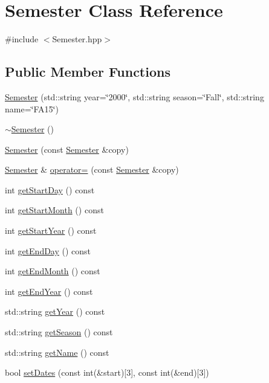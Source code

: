 \hypertarget{class_semester}{}\section{Semester Class Reference}
\label{class_semester}


{\ttfamily \#include $<$Semester.\+hpp$>$}

\subsection*{Public Member Functions}
\begin{DoxyCompactItemize}
\item 
\hyperlink{class_semester_a1922b7c568fc93f922cc8d36410d107c}{Semester} (std\+::string year=\char`\"{}2000\char`\"{}, std\+::string season=\char`\"{}Fall\char`\"{}, std\+::string name=\char`\"{}F\+A15\char`\"{})
\item 
\hyperlink{class_semester_af3f2f2493a420d978d0f38f22b82d73a}{$\sim$\+Semester} ()
\item 
\hyperlink{class_semester_af1b2555b0274de748337c5c8b98e3002}{Semester} (const \hyperlink{class_semester}{Semester} \&copy)
\item 
\hyperlink{class_semester}{Semester} \& \hyperlink{class_semester_a2f745c47a3694a169d97c98ac5cbfc1a}{operator=} (const \hyperlink{class_semester}{Semester} \&copy)
\item 
int \hyperlink{class_semester_a6048d69cc63eba7786b1bdcb12dbf73c}{get\+Start\+Day} () const 
\item 
int \hyperlink{class_semester_a2f54945f02a49a7685c8419ef5a9c380}{get\+Start\+Month} () const 
\item 
int \hyperlink{class_semester_a69fc9171c2fba700f54d5c26681b25f7}{get\+Start\+Year} () const 
\item 
int \hyperlink{class_semester_aaa852bfc2dd377786ebfda1abad54e70}{get\+End\+Day} () const 
\item 
int \hyperlink{class_semester_a891a98c67392c81ea5f8b573cd0652a0}{get\+End\+Month} () const 
\item 
int \hyperlink{class_semester_a6502a8e6aaf050fe1937ffe6d6ba7e57}{get\+End\+Year} () const 
\item 
std\+::string \hyperlink{class_semester_ab6839d0281dd5450ee8e9e036366e332}{get\+Year} () const 
\item 
std\+::string \hyperlink{class_semester_afe029ae6bcce7985945ec380a8629ec6}{get\+Season} () const 
\item 
std\+::string \hyperlink{class_semester_a5ab15fe6e0f8785b35e939e5f966ee21}{get\+Name} () const 
\item 
bool \hyperlink{class_semester_aaef41931bcf35de872c7e0c612027cd2}{set\+Dates} (const int(\&start)\mbox{[}3\mbox{]}, const int(\&end)\mbox{[}3\mbox{]})
\end{DoxyCompactItemize}

